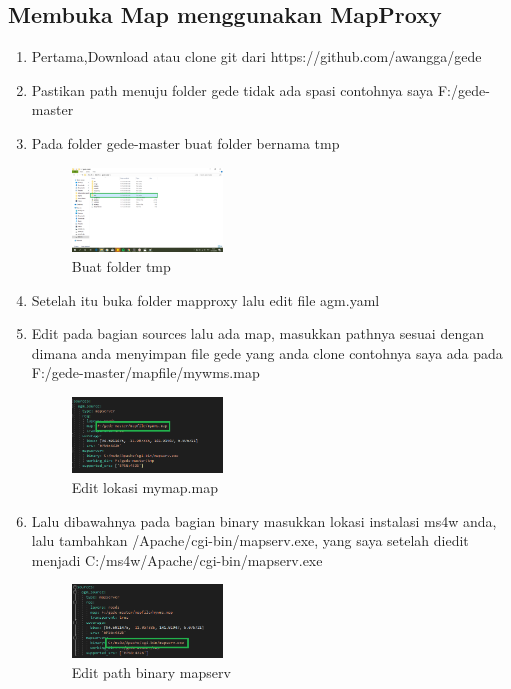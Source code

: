 \subsection{Membuka Map menggunakan MapProxy}
\begin{enumerate}
  \item Pertama,Download atau clone git dari https://github.com/awangga/gede
  \item Pastikan path menuju folder gede tidak ada spasi contohnya saya F:/gede-master
  \item Pada folder gede-master buat folder bernama tmp
  \hfill\break
  \begin{figure}[H]
  \includegraphics[width=4cm]{figures/tugas4/1174053/26.png}
  \centering
  \caption{Buat folder tmp}
  \end{figure}
  \item Setelah itu buka folder mapproxy lalu edit file agm.yaml
  \item Edit pada bagian sources lalu ada map, masukkan pathnya sesuai dengan dimana anda menyimpan file gede yang anda clone contohnya saya ada pada F:/gede-master/mapfile/mywms.map
  \hfill\break
  \begin{figure}[H]
  \includegraphics[width=4cm]{figures/tugas4/1174053/27.png}
  \centering
  \caption{Edit lokasi mymap.map}
  \end{figure}
  \item Lalu dibawahnya pada bagian binary masukkan lokasi instalasi ms4w anda, lalu tambahkan /Apache/cgi-bin/mapserv.exe, yang saya setelah diedit menjadi C:/ms4w/Apache/cgi-bin/mapserv.exe
  \hfill\break
  \begin{figure}[H]
  \includegraphics[width=4cm]{figures/tugas4/1174053/28.png}
  \centering
  \caption{Edit path binary mapserv}
  \end{figure}


\end{enumerate}
